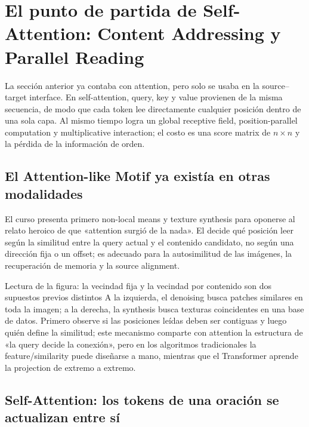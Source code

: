 \section{El punto de partida de Self-Attention: Content Addressing y Parallel Reading}

La sección anterior ya contaba con attention, pero solo se usaba en la source--target interface. En self-attention, query, key y value provienen de la misma secuencia, de modo que cada token lee directamente cualquier posición dentro de una sola capa. Al mismo tiempo logra un global receptive field, position-parallel computation y multiplicative interaction; el costo es una score matrix de $n\times n$ y la pérdida de la información de orden.

\subsection{El Attention-like Motif ya existía en otras modalidades}

El curso presenta primero non-local means y texture synthesis para oponerse al relato heroico de que «attention surgió de la nada». El  decide qué posición leer según la similitud entre la query actual y el contenido candidato, no según una dirección fija o un offset; es adecuado para la autosimilitud de las imágenes, la recuperación de memoria y la source alignment.


\begin{knowledgebox}{Lectura de la figura: la vecindad fija y la vecindad por contenido son dos supuestos previos distintos}
A la izquierda, el denoising busca patches similares en toda la imagen; a la derecha, la synthesis busca texturas coincidentes en una base de datos. Primero observe si las posiciones leídas deben ser contiguas y luego quién define la similitud; este mecanismo comparte con attention la estructura de «la query decide la conexión», pero en los algoritmos tradicionales la feature/similarity puede diseñarse a mano, mientras que el Transformer aprende la projection de extremo a extremo.
\end{knowledgebox}

\subsection{Self-Attention: los tokens de una oración se actualizan entre sí}

